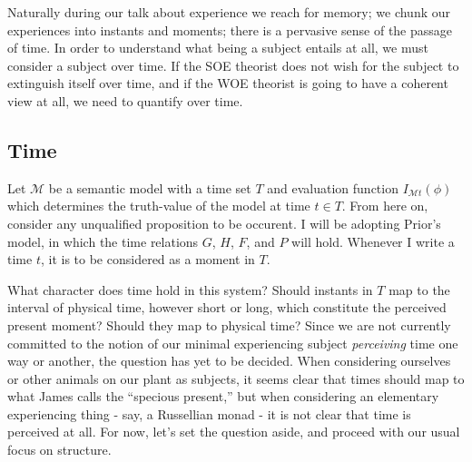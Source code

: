 \documentclass[leqno]{article}
\newcommand{\temporaleval}[2]{ I_{\mathcal{M}#1}(#2) }
\begin{document}
	 Naturally
	during our talk about experience we reach for memory; we chunk our experiences
	into instants and moments; there is a pervasive sense of the passage of time.
	In order to understand what being a subject entails at all, we must consider a
	subject over time. If the SOE theorist does not wish for the subject to
	extinguish itself over time, and if the WOE theorist is going to have a coherent
	view at all, we need to quantify over time.

	\subsection{Time}

	Let $\mathcal{M}$ be a semantic model with a time set $T$ and evaluation function
	$\temporaleval{t}{\phi}$ which determines the truth-value of the model at time
	$t\in T$. From here on, consider any unqualified proposition to be occurent. I
	will be adopting Prior's model, in which the time relations $G$, $H$, $F$, and
	$P$ will hold. Whenever I write a time $t$, it is to be considered as a moment
	in $T$.

	What character does time hold in this system? Should instants in $T$ map to the
	interval of physical time, however short or long, which constitute the perceived
	present moment? Should they map to physical time? Since we are not currently committed
	to the notion of our minimal experiencing subject \emph{perceiving} time one
	way or another, the question has yet to be decided. When considering ourselves
	or other animals on our plant as subjects, it seems clear that times should map
	to what James calls the \enquote{specious present,} but when considering an
	elementary experiencing thing - say, a Russellian monad - it is not clear that
	time is perceived at all. For now, let's set the question aside, and proceed
	with our usual focus on structure.
\end{document}
